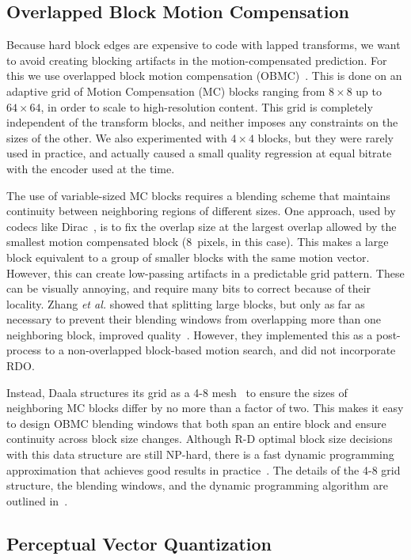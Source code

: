\documentclass[english,conference,10pt]{IEEEtran}
\begin{document}
\subsection{Overlapped Block Motion Compensation}
\label{sec:OBMC}

Because hard block edges are expensive to code with lapped transforms, we
want to avoid creating blocking artifacts in the motion-compensated
prediction. For this we use overlapped block motion compensation
(OBMC)~\cite{OBMC}. This is done on an adaptive grid of Motion Compensation
(MC) blocks ranging from $8\times 8$ up to $64\times 64$, in order to scale to
high-resolution content. This grid is completely independent of the transform
blocks, and neither imposes any constraints on the sizes of the other. We also
experimented with $4\times 4$ blocks, but they were rarely used in practice,
and actually caused a small quality regression at equal bitrate with the
encoder used at the time.

The use of variable-sized MC blocks requires a blending scheme that maintains
continuity between neighboring regions of different sizes. One approach, used
by codecs like Dirac~\cite{Dirac}, is to fix the overlap size at the largest
overlap allowed by the smallest motion compensated block (8~pixels, in this
case). This makes a large
block equivalent to a group of smaller blocks with the same motion vector.
However, this can create low-passing artifacts in a predictable grid pattern.
These can be visually annoying, and require many bits to correct because of
their locality. Zhang \textit{et al.} showed that splitting large blocks,
but only as far as necessary to prevent their blending windows from
overlapping more than one neighboring block, improved quality~\cite{ZAS98}.
However, they implemented this as a post-process to a non-overlapped
block-based motion search, and did not incorporate RDO\@.

Instead, Daala structures its grid as a 4-8 mesh~\cite{DWSMAM97} to ensure the
sizes of neighboring MC blocks differ by no more than a factor of two. This
makes it easy to design OBMC blending windows that both span an entire block
and ensure continuity across block size changes. Although R-D optimal block
size decisions with this data structure are still NP-hard, there is a fast
dynamic programming approximation that achieves good results in
practice~\cite{Bal01}. The details of the 4-8 grid structure, the blending
windows, and the dynamic programming algorithm are outlined in~\cite{OBMC}.

\subsection{Perceptual Vector Quantization}
\label{sec:PVQ}
\end{document}
